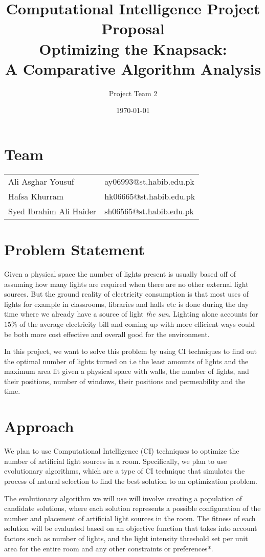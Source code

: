 \documentclass{article}
\title{Computational Intelligence Project Proposal\\
      \large Optimizing the Knapsack: \\
      A Comparative Algorithm Analysis}
\author{Project Team 2}
\date{\today}
\begin{document}
\maketitle

\section*{Team}
\begin{tabular}{ l l }
    Ali Asghar Yousuf & ay06993@st.habib.edu.pk \\ 
    Hafsa Khurram & hk06665@st.habib.edu.pk \\
    Syed Ibrahim Ali Haider & sh06565@st.habib.edu.pk 
   \end{tabular}

\section{Problem Statement}


Given a physical space the number of lights present is usually based off of assuming how many lights are required when there are no other external light sources. But the ground reality of electricity consumption is that most uses of lights for example in classrooms, libraries and halls etc is done during the day time where we already have a source of light \textit{the sun}. Lighting alone accounts for \(15\%\) of the average electricity bill \cite{energy.gov} and coming up with more efficient ways could be both more cost effective and overall good for the environment.

In this project, we want to solve this problem by using CI techniques to find out the optimal number of lights turned on i.e the least amounts of lights and the maximum area lit given a physical space with walls, the number of lights, and their positions, number of windows, their positions and permeability and the time. 
\section{Approach}

We plan to use Computational Intelligence (CI) techniques to optimize the number of artificial light sources in a room. Specifically, we plan to use evolutionary algorithms, which are a type of CI technique that simulates the process of natural selection to find the best solution to an optimization problem.

The evolutionary algorithm we will use will involve creating a population of candidate solutions, where each solution represents a possible configuration of the number and placement of artificial light sources in the room. The fitness of each solution will be evaluated based on an objective function that takes into account factors such as number of lights, and the light intensity threshold set per unit area for the entire room and any other constraints or preferences*.
\end{document}

